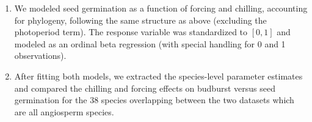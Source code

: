 \documentclass{article}
\begin{document}
\begin{enumerate}
\item We modeled seed germination as a function of forcing and chilling, accounting for phylogeny, following the same structure as above (excluding the photoperiod term). The response variable was standardized to $[0,1]$ and modeled as an ordinal beta regression (with special handling for 0 and 1 observations). %
    
\item After fitting both models, we extracted the species-level parameter estimates and compared the chilling and forcing effects on budburst versus seed germination for the 38 species overlapping between the two datasets which are all angiosperm species.
\end{enumerate}
\end{document}
